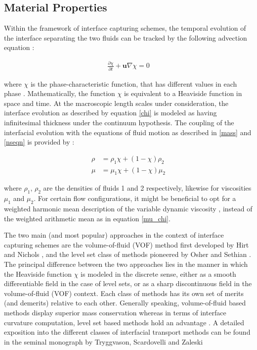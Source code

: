 \subsection*{Material Properties}

Within the framework of interface capturing schemes, the 
temporal evolution of the interface separating the two fluids
can be tracked by the following advection equation : 

\begin{align} 
	\frac{\partial \chi}{\partial t} + \boldsymbol{u}\nabla\chi = 0 	
\label{chi}
\end{align}

where $\chi$ is the phase-characteristic function, that has different values 
in each phase  . Mathematically, the function $\chi$
is equivalent to a Heaviside function in space and time. 
At the macroscopic length scales under consideration, the interface evolution
as described by equation \ref{chi} is modeled as having infinitesimal thickness
under the continuum hypothesis. The coupling of the interfacial evolution with
the equations of fluid motion as described in \ref{mass} and \ref{nseqn} is provided by :  

\begin{align}
	\rho &= \rho_{1}\chi + \left(1 - \chi\right)\rho_{2} \label {rho_chi} \\ 
	\mu  &= \mu_{1}\chi  + \left(1 - \chi\right)\mu_{2}  
  \label{mu_chi}
\end{align}

where $\rho_{1}$, $\rho_{2}$ are the densities of fluids 1 and 2 respectively, 
likewise for viscosities $\mu_{1}$ and $\mu_{2}$. For certain flow configurations, 
it might be beneficial to opt for a weighted harmonic mean description of the 
variable dynamic viscosity , instead of the weighted arithmetic mean as in equation \ref{mu_chi}. 

The two main (and most popular)
approaches in the context of interface capturing schemes are the 
volume-of-fluid (VOF) method first developed by Hirt and Nichols \cite{hirt1981volume}, 
and the level set class of methods pioneered by Osher and Sethian \cite{osher1988fronts}.
The principal difference between the two approaches lies in the manner in which
the Heaviside function $\chi$ is modeled in the discrete sense, 
either as a smooth differentiable field in
the case of level sets, or as a sharp discontinuous field in the volume-of-fluid (VOF) context.  
Each class of methods has its own set of merits (and demerits) relative to each other. 
Generally speaking, volume-of-fluid based methods display superior mass conservation
whereas in terms of interface curvature computation, level set based methods hold an advantage
 . 
A detailed exposition into the different classes of interfacial transport
methods can be found in the seminal monograph by Tryggvason, Scardovelli and Zaleski \cite{zaleskibook}

